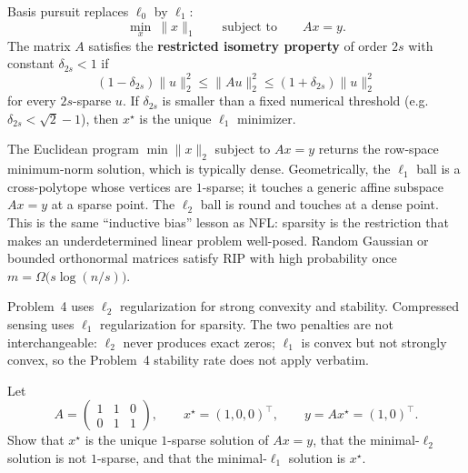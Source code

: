 \begin{definition}
\label{def:mlu-bp-rip}
Basis pursuit replaces $\ell_0$ by $\ell_1$:
\[
\min_x\ \lVert x\rVert_1
\qquad\text{subject to}\qquad
Ax=y.
\]
The matrix $A$ satisfies the \textbf{restricted isometry property} of order $2s$ with constant $\delta_{2s}<1$ if
\[
(1-\delta_{2s})\lVert u\rVert_2^2
\le
\lVert Au\rVert_2^2
\le
(1+\delta_{2s})\lVert u\rVert_2^2
\]
for every $2s$-sparse $u$. If $\delta_{2s}$ is smaller than a fixed numerical threshold (e.g.\ $\delta_{2s}<\sqrt{2}-1$), then $x^\star$ is the unique $\ell_1$ minimizer.
\end{definition}

\begin{remark}
\label{rem:mlu-l1-not-l2}
The Euclidean program $\min\lVert x\rVert_2$ subject to $Ax=y$ returns the row-space minimum-norm solution, which is typically dense. Geometrically, the $\ell_1$ ball is a cross-polytope whose vertices are $1$-sparse; it touches a generic affine subspace $Ax=y$ at a sparse point. The $\ell_2$ ball is round and touches at a dense point. This is the same ``inductive bias'' lesson as NFL: sparsity is the restriction that makes an underdetermined linear problem well-posed. Random Gaussian or bounded orthonormal matrices satisfy RIP with high probability once $m=\Omega\bigl(s\log(n/s)\bigr)$.
\end{remark}

\begin{remark}
Problem~4 uses $\ell_2$ regularization for strong convexity and stability. Compressed sensing uses $\ell_1$ regularization for sparsity. The two penalties are not interchangeable: $\ell_2$ never produces exact zeros; $\ell_1$ is convex but not strongly convex, so the Problem~4 stability rate does not apply verbatim.
\end{remark}

\begin{exercise}
\label{ex:mlu-cs-tiny}
Let
\[
A
=
\begin{pmatrix}
1&1&0\\
0&1&1
\end{pmatrix},
\qquad
x^\star=(1,0,0)^\top,
\qquad
y=Ax^\star=(1,0)^\top.
\]
Show that $x^\star$ is the unique $1$-sparse solution of $Ax=y$, that the minimal-$\ell_2$ solution is not $1$-sparse, and that the minimal-$\ell_1$ solution is $x^\star$.
\end{exercise}

